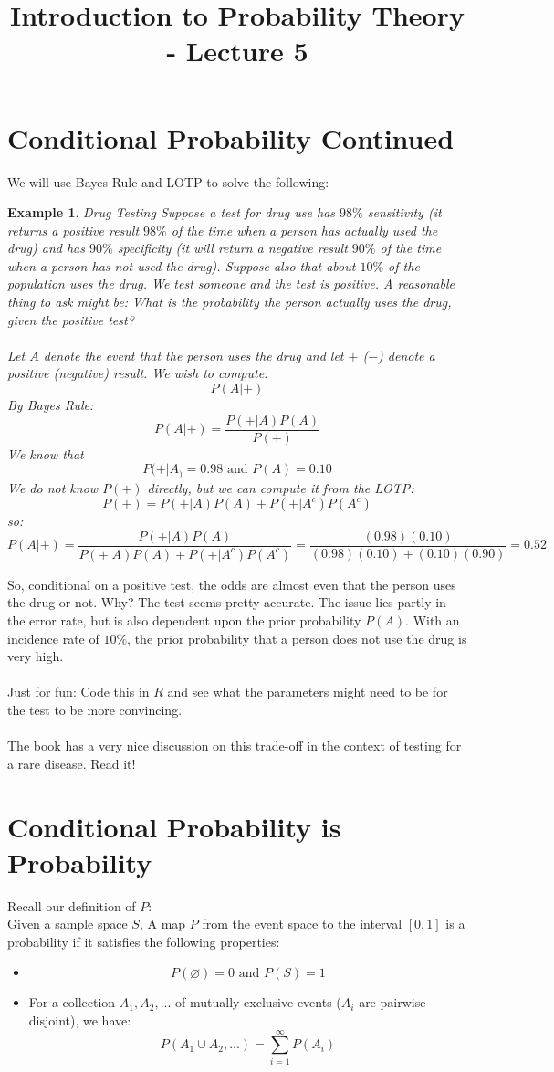 \documentclass[12pt]{article} %
\title{Introduction to Probability Theory - Lecture 5}
\newtheorem{example}{Example}
\begin{document}
\maketitle
\section{Conditional Probability Continued}
We will use Bayes Rule and LOTP to solve the following:
\begin{example}{Drug Testing}
Suppose a test for drug use has $98 \%$ sensitivity (it returns a positive result $98\%$ of the time when a person has actually used the drug) and has $90\%$ specificity (it will return a negative result $90\%$ of the time when a person has not used the drug). Suppose also that about $10\%$ of the population uses the drug. We test someone and the test is positive. A reasonable thing to ask might be: What is the probability the person actually uses the drug, given the positive test?\\\\
Let $A$ denote the event that the person uses the drug and let $+$ ($-$)  denote a positive (negative) result. We wish to compute:
$$P(A|+)$$
By Bayes Rule:
$$P(A|+) = \frac{P(+|A)P(A)}{P(+)}$$
We know that
$$P(+|A_) = 0.98 \textrm{ and } P(A) =0.10$$
We do not know $P(+)$ directly, but we can compute it from the LOTP:
$$P(+) = P(+|A)P(A) + P(+|A^c)P(A^c)$$
so:
$$P(A|+) = \frac{P(+|A)P(A)}{P(+|A)P(A) + P(+|A^c)P(A^c)} = \frac{(0.98)(0.10)}{(0.98)(0.10)+(0.10)(0.90)} = 0.52$$
\end{example}
So, conditional on a positive test, the odds are almost even that the person uses the drug or not. Why? The test seems pretty accurate. The issue lies partly in the error rate, but is also dependent upon the prior probability $P(A)$. With an incidence rate of $10\%$, the prior probability that a person does not use the drug is very high.\\\\
Just for fun: Code this in $R$ and see what the parameters might need to be for the test to be more convincing.\\\\
The book has a very nice discussion on this trade-off in the context of testing for a rare disease. Read it!
\section{Conditional Probability is Probability}
Recall our definition of $P$:\\

Given a sample space $S$,
A map $P$ from the event space to the interval $[0,1]$ is a probability if it satisfies the following properties:
\begin{itemize}
\item $$P(\varnothing) = 0 \textrm{ and } P(S) = 1$$
\item For a collection $A_1,A_2,...$ of mutually exclusive events ($A_i$ are pairwise disjoint), we have:
$$P(A_1\cup A_2,...) = \sum_{i=1}^\infty P(A_i)$$
\end{itemize}
\end{document}

